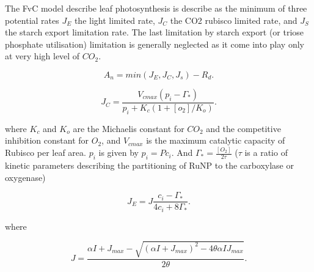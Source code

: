 \documentclass[a4paper,11pt]{article}
\begin{document}
The FvC model describe leaf photosynthesis is describe as the minimum
of three potential rates $J_E$ the light limited rate, $J_C$ the CO2
rubisco limited rate, and $J_S$ the starch export limitation rate. The
last limitation by starch export (or triose phosphate utilisation)
limitation is generally neglected as it come into play only at very
high level of $CO_2$.

\begin{equation}
\label{eq:An}
A_n= min(J_E, J_C, J_s) - R_d.
\end{equation}






\begin{equation}
\label{eq:JC}
J_C= \frac{V_{cmax} (p_i - \Gamma_*)}{p_i + K_c (1+[o_2]/K_o)}.
\end{equation}

where $K_c$ and $K_o$ are the Michaelis constant for $CO_2$ and the competitive inhibition constant for $O_2$, and $V_{cmax}$ is the maximum catalytic capacity of Rubisco per leaf area.
$p_i$ is given by $p_i = P c_i$. And $\Gamma_* = \frac{[O_2]}{2\tau}$ ($\tau$ is a ratio of kinetic parameters describing the partitioning of RuNP to the carboxylase or oxygenase)

\begin{equation}
\label{eq:JCb}
J_E = J \frac{ c_i - \Gamma_*}{4c_i + 8 \Gamma_*}.
\end{equation}

where

\begin{equation}
\label{eq:Jlight}
J = \frac{ \alpha I + J_{max} - \sqrt{(\alpha I + J_{max})^2 - 4 \theta \alpha I J_{max}}}{2\theta}.
\end{equation}
\end{document}
